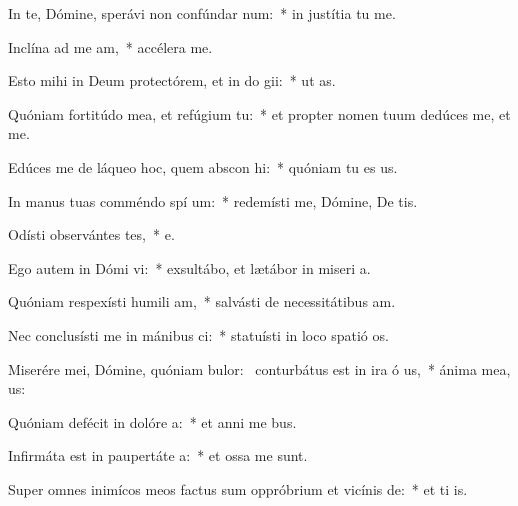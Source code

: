 \item In te, Dómine, sperávi non confúndar  num:~* in justítia tu  me.
\item Inclína ad me  am,~* accélera   me.
\item Esto mihi in Deum protectórem, et in do gii:~* ut   as.
\item Quóniam fortitúdo mea, et refúgium   tu:~* et propter nomen tuum dedúces me, et  me.
\item Edúces me de láqueo hoc, quem abscon hi:~* quóniam tu es  us.
\item In manus tuas comméndo spí um:~* redemísti me, Dómine, De tis.
\item Odísti observántes tes,~* e.
\item Ego autem in Dómi vi:~* exsultábo, et lætábor in miseri a.
\item Quóniam respexísti humili am,~* salvásti de necessitátibus  am.
\item Nec conclusísti me in mánibus ci:~* statuísti in loco spatió  os.
\item Miserére mei, Dómine, quóniam bulor:~\pscross{} conturbátus est in ira ó us,~* ánima mea,   us:
\item Quóniam defécit in dolóre  a:~* et anni me  bus.
\item Infirmáta est in paupertáte  a:~* et ossa me  sunt.
\item Super omnes inimícos meos factus sum oppróbrium et vicínis  de:~* et ti  is.
